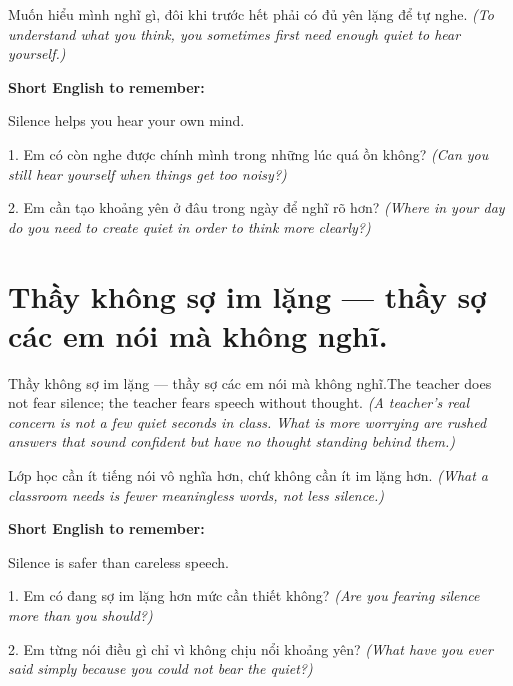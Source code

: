 \begin{baihoc}
Muốn hiểu mình nghĩ gì, đôi khi trước hết phải có đủ yên lặng để tự nghe.
\textit{(To understand what you think, you sometimes first need enough quiet to hear yourself.)}
\end{baihoc}

\begin{ghinhoanh}
\textbf{Short English to remember:}

Silence helps you hear your own mind.

\end{ghinhoanh}

\begin{tuhocnhanh}
1. Em có còn nghe được chính mình trong những lúc quá ồn không? \textit{(Can you still hear yourself when things get too noisy?)}

2. Em cần tạo khoảng yên ở đâu trong ngày để nghĩ rõ hơn? \textit{(Where in your day do you need to create quiet in order to think more clearly?)}
\end{tuhocnhanh}
\ngancach


\section{Thầy không sợ im lặng — thầy sợ các em nói mà không nghĩ.}
\begin{truyen}{Thầy không sợ im lặng — thầy sợ các em nói mà không nghĩ.}{The teacher does not fear silence; the teacher fears speech without thought.}
\textit{(A teacher's real concern is not a few quiet seconds in class. What is more worrying are rushed answers that sound confident but have no thought standing behind them.)}
\end{truyen}

\begin{baihoc}
Lớp học cần ít tiếng nói vô nghĩa hơn, chứ không cần ít im lặng hơn.
\textit{(What a classroom needs is fewer meaningless words, not less silence.)}
\end{baihoc}

\begin{ghinhoanh}
\textbf{Short English to remember:}

Silence is safer than careless speech.

\end{ghinhoanh}

\begin{tuhocnhanh}
1. Em có đang sợ im lặng hơn mức cần thiết không? \textit{(Are you fearing silence more than you should?)}

2. Em từng nói điều gì chỉ vì không chịu nổi khoảng yên? \textit{(What have you ever said simply because you could not bear the quiet?)}
\end{tuhocnhanh}
\ngancach


